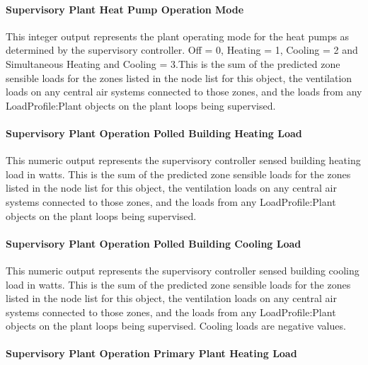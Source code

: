 \paragraph{Supervisory Plant Heat Pump Operation Mode}\label{operation-scheme-outputs-supervisory-plant-operation-mode}

This integer output represents the plant operating mode for the heat pumps as determined by the supervisory controller. Off = 0, Heating = 1, Cooling = 2 and Simultaneous Heating and Cooling = 3.This is the sum of the predicted zone sensible loads for the zones listed in the node list for this object, the ventilation loads on any central air systems connected to those zones, and the loads from any LoadProfile:Plant objects on the plant loops being supervised. 

\paragraph{Supervisory Plant Operation Polled Building Heating Load}\label{operation-scheme-outputs-supervisory-plant-operation-sensed-heating-load}

This numeric output represents the supervisory controller sensed building heating load in watts.  This is the sum of the predicted zone sensible loads for the zones listed in the node list for this object, the ventilation loads on any central air systems connected to those zones, and the loads from any LoadProfile:Plant objects on the plant loops being supervised. 

\paragraph{Supervisory Plant Operation Polled Building Cooling Load}\label{operation-scheme-outputs-supervisory-plant-operation-sensed-cooling-load}

This numeric output represents the supervisory controller sensed building cooling load in watts.  This is the sum of the predicted zone sensible loads for the zones listed in the node list for this object, the ventilation loads on any central air systems connected to those zones, and the loads from any LoadProfile:Plant objects on the plant loops being supervised. Cooling loads are negative values.

\paragraph{Supervisory Plant Operation Primary Plant Heating Load}\label{operation-scheme-outputs-supervisory-plant-heating-loads}

